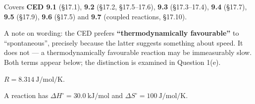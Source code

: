 \documentclass{apchem-exam}
\begin{document}
\apctitleblock

\begin{apcnote}[Scope]
Covers \textbf{CED 9.1} (\S17.1), \textbf{9.2} (\S17.2, \S17.5--17.6),
\textbf{9.3} (\S17.3--17.4), \textbf{9.4} (\S17.7), \textbf{9.5}
(\S17.9), \textbf{9.6} (\S17.5) and \textbf{9.7} (coupled reactions,
\S17.10).

A note on wording: the CED prefers \textbf{``thermodynamically
favourable''} to ``spontaneous'', precisely because the latter suggests
something about speed. It does not --- a thermodynamically favourable
reaction may be immeasurably slow. Both terms appear below; the
distinction is examined in Question 1(e).

$R = \SI{8.314}{\joule\per\mole\per\kelvin}$.
\end{apcnote}



A reaction has $\Delta H^\circ = \SI{+30.0}{\kilo\joule\per\mole}$ and
$\Delta S^\circ = \SI{+100}{\joule\per\mole\per\kelvin}$.
\end{document}
